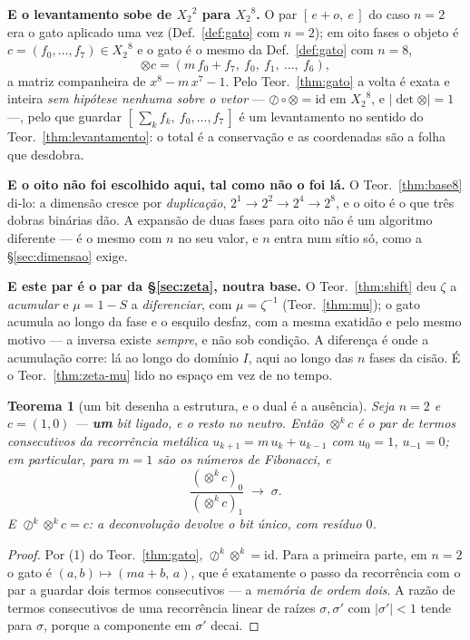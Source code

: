\documentclass[11pt,a4paper]{article}
\newcommand{\abs}[1]{\lvert #1\rvert}
\newcommand{\Zc}{\ensuremath{X_2}}
\newtheorem{teorema}{Teorema}
\begin{document}
\medskip\noindent\textbf{E o levantamento sobe de $\Zc^{2}$ para $\Zc^{8}$.} O
par $[\,e+o,\ e\,]$ do caso $n=2$ era o gato aplicado uma vez
(Def.~\ref{def:gato} com $n=2$); em oito fases o objeto é
$c=(f_0,\dots,f_7)\in\Zc^{8}$ e o gato é o mesmo da Def.~\ref{def:gato} com
$n=8$,
\[
\otimes c=(m\,f_0+f_7,\ f_0,\ f_1,\ \dots,\ f_6),
\]
a matriz companheira de $x^{8}-m\,x^{7}-1$. Pelo Teor.~\ref{thm:gato} a volta é
exata e inteira \emph{sem hipótese nenhuma sobre o vetor} --- $\oslash\circ\otimes=\mathrm{id}$
em $\Zc^{8}$, e $\abs{\det\otimes}=1$ ---, pelo que guardar
$[\,\sum_k f_k,\ f_0,\dots,f_7\,]$ é um levantamento no sentido do
Teor.~\ref{thm:levantamento}: o total é a conservação e as coordenadas são a
folha que desdobra.

\medskip\noindent\textbf{E o oito não foi escolhido aqui, tal como não o foi
lá.} O Teor.~\ref{thm:base8} di-lo: a dimensão cresce por \emph{duplicação},
$2^{1}\to2^{2}\to2^{4}\to2^{8}$, e o oito é o que três dobras binárias dão. A
expansão de duas fases para oito não é um algoritmo diferente --- é o mesmo com
$n$ no seu valor, e $n$ entra num sítio só, como a §\ref{sec:dimensao} exige.

\medskip
\medskip\noindent\textbf{E este par é o par da §\ref{sec:zeta}, noutra base.} O
Teor.~\ref{thm:shift} deu $\zeta$ a \emph{acumular} e $\mu=1-S$ a
\emph{diferenciar}, com $\mu=\zeta^{-1}$ (Teor.~\ref{thm:mu}); o gato acumula ao
longo da fase e o esquilo desfaz, com a mesma exatidão e pelo mesmo motivo --- a
inversa existe \emph{sempre}, e não sob condição. A diferença é onde a
acumulação corre: lá ao longo do domínio $I$, aqui ao longo das $n$ fases da
cisão. É o Teor.~\ref{thm:zeta-mu} lido no espaço em vez de no tempo.

\begin{teorema}[um bit desenha a estrutura, e o dual é a ausência]\label{thm:bitunico}
Seja $n=2$ e $c=(1,0)$ --- \textbf{um} bit ligado, e o resto no neutro. Então
$\otimes^{k}c$ é o par de termos consecutivos da recorrência metálica
$u_{k+1}=m\,u_k+u_{k-1}$ com $u_0=1$, $u_{-1}=0$; em particular, para $m=1$ são
os números de Fibonacci, e
\[
\frac{(\otimes^{k}c)_0}{(\otimes^{k}c)_1}\;\longrightarrow\;\sigma .
\]
E $\oslash^{k}\otimes^{k}c=c$: a deconvolução devolve o bit único, com resíduo
$0$.
\end{teorema}

\begin{proof}
Por (1) do Teor.~\ref{thm:gato}, $\oslash^{k}\otimes^{k}=\mathrm{id}$. Para a
primeira parte, em $n=2$ o gato é $(a,b)\mapsto(ma+b,\,a)$, que é exatamente o
passo da recorrência com o par a guardar dois termos consecutivos --- a
\emph{memória de ordem dois}. A razão de termos consecutivos de uma recorrência
linear de raízes $\sigma,\sigma'$ com $\lvert\sigma'\rvert<1$ tende para
$\sigma$, porque a componente em $\sigma'$ decai.
\end{proof}
\end{document}

